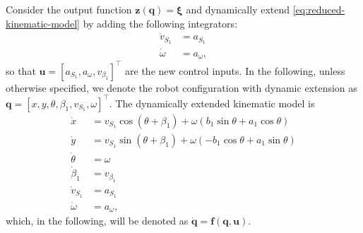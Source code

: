 Consider the output function $\bm{z}(\bm{q})=\bm{\xi}$ and dynamically extend
\eqref{eq:reduced-kinematic-model} by adding the following integrators:
\begin{subequations}
    \begin{align*}
        \dot{v}_{S_1} &= a_{S_1} \\
        \dot{\omega} &= a_{\omega},
    \end{align*}
\end{subequations}
so that $\bm{u} = \left[ a_{S_1}, a_{\omega}, v_{\beta_1} \right]^\top $ are
the new control inputs. In the following, unless otherwise specified, we denote
the robot configuration with dynamic extension as
$\bm{q} = [x, y, \theta, \beta_1, v_{S_1}, \omega]^\top$.
The dynamically extended kinematic model is
\begin{equation}
\label{eq:dynamically-extended-kinematic-model}
\begin{split}
    \dot{x} &= v_{S_1} \cos(\theta + \beta_1) + \omega (b_1 \sin\theta + a_1 \cos\theta) \\
    \dot{y} &= v_{S_1} \sin(\theta + \beta_1) + \omega (-b_1 \cos\theta + a_1 \sin\theta) \\
    \dot{\theta} &= \omega \\
    \dot{\beta}_1 &= v_{\beta_1} \\
    \dot{v}_{S_1} &= a_{{S_1}} \\
    \dot{\omega} &= a_{\omega},
\end{split}
\end{equation}
which, in the following, will be denoted as $\dot{\bm{q}} = \bm{f}(\bm{q}, \bm{u})$.

